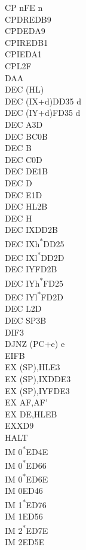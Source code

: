 \documentclass[twoside,openright,a4paper]{book}
\begin{document}
\begin{multicols}{3}
{\begin{tabbing}
	CP n\>FE n\\
	CPDR\>EDB9\\
	CPD\>EDA9\\
	CPIR\>EDB1\\
	CPI\>EDA1\\
	CPL\>2F\\
	DAA\\
	DEC (HL)\\
	DEC (IX+d)\>DD35 d\\
	DEC (IY+d)\>FD35 d\\
	DEC A\>3D\\
	DEC BC\>0B\\
	DEC B\\
	DEC C\>0D\\
	DEC DE\>1B\\
	DEC D\\
	DEC E\>1D\\
	DEC HL\>2B\\
	DEC H\\
	DEC IX\>DD2B\\
	DEC IXh\textsuperscript{*}\>DD25\\
	DEC IXl\textsuperscript{*}\>DD2D\\
	DEC IY\>FD2B\\
	DEC IYh\textsuperscript{*}\>FD25\\
	DEC IYl\textsuperscript{*}\>FD2D\\
	DEC L\>2D\\
	DEC SP\>3B\\
	DI\>F3\\
	DJNZ (PC+e) e\\
	EI\>FB\\
	EX (SP),HL\>E3\\
	EX (SP),IX\>DDE3\\
	EX (SP),IY\>FDE3\\
	EX AF,AF'\\
	EX DE,HL\>EB\\
	EXX\>D9\\
	HALT\\
	IM 0\textsuperscript{*}\>ED4E\\
	IM 0\textsuperscript{*}\>ED66\\
	IM 0\textsuperscript{*}\>ED6E\\
	IM 0\>ED46\\
	IM 1\textsuperscript{*}\>ED76\\
	IM 1\>ED56\\
	IM 2\textsuperscript{*}\>ED7E\\
	IM 2\>ED5E\\

\end{tabbing}}
\end{multicols}
\end{document}

